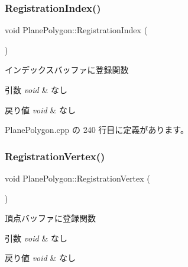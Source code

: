 \subsubsection{\texorpdfstring{Registration\+Index()}{RegistrationIndex()}}
{\footnotesize\ttfamily void Plane\+Polygon\+::\+Registration\+Index (\begin{DoxyParamCaption}{ }\end{DoxyParamCaption})\hspace{0.3cm}{\ttfamily [private]}}



インデックスバッファに登録関数 


\begin{DoxyParams}{引数}
{\em void} & なし \\
\hline
\end{DoxyParams}

\begin{DoxyRetVals}{戻り値}
{\em void} & なし \\
\hline
\end{DoxyRetVals}


 Plane\+Polygon.\+cpp の 240 行目に定義があります。

\mbox{\label{class_plane_polygon_af4ba95cfaf0aba506eeb58cdc80bfd46}} 
\subsubsection{\texorpdfstring{Registration\+Vertex()}{RegistrationVertex()}}
{\footnotesize\ttfamily void Plane\+Polygon\+::\+Registration\+Vertex (\begin{DoxyParamCaption}{ }\end{DoxyParamCaption})\hspace{0.3cm}{\ttfamily [private]}}



頂点バッファに登録関数 


\begin{DoxyParams}{引数}
{\em void} & なし \\
\hline
\end{DoxyParams}

\begin{DoxyRetVals}{戻り値}
{\em void} & なし \\
\hline
\end{DoxyRetVals}


